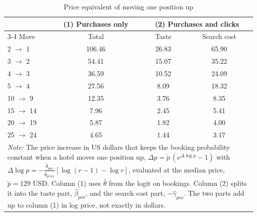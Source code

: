 \begin{table}[htbp]
\centering
\caption{Price equivalent of moving one position up}
\label{tab:price_equivalent}
\begin{tabular}{lccc}
\toprule
 & (1) Purchases only & \multicolumn{2}{c}{(2) Purchases and clicks} \\
\cmidrule(lr){3-4}
Move & Total & Taste & Search cost \\
\midrule
2 $\to$ 1 & 106.46 & 26.83 & 65.90 \\
3 $\to$ 2 & 54.41 & 15.07 & 35.22 \\
4 $\to$ 3 & 36.59 & 10.52 & 24.09 \\
5 $\to$ 4 & 27.56 & 8.09 & 18.32 \\
10 $\to$ 9 & 12.35 & 3.76 & 8.35 \\
15 $\to$ 14 & 7.96 & 2.45 & 5.41 \\
20 $\to$ 19 & 5.87 & 1.82 & 4.00 \\
25 $\to$ 24 & 4.65 & 1.44 & 3.17 \\
\bottomrule
\multicolumn{4}{p{0.9\linewidth}}{\footnotesize \textit{Note:} The price increase in US dollars that keeps the booking probability constant when a hotel moves one position up, $\Delta p = \tilde p\,(e^{\Delta \log p} - 1)$ with $\Delta \log p = -\frac{\hat\theta_{pos}}{\hat\theta_{price}}\left[\log(r-1) - \log r\right]$, evaluated at the median price, $\tilde p = 129$ USD. Column (1) uses $\hat\theta$ from the logit on bookings. Column (2) splits it into the taste part, $\hat\beta_{pos}$, and the search cost part, $-\hat\gamma_{pos}$. The two parts add up to column (1) in log price, not exactly in dollars.} \\
\end{tabular}
\end{table}
